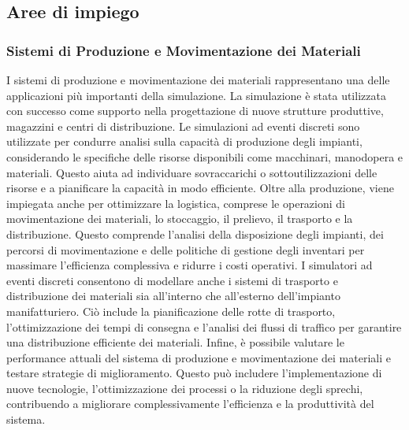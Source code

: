 \documentclass[12pt,a4paper,openright,twoside]{book}
\begin{document}
\subsection{Aree di impiego}
\subsubsection{Sistemi di Produzione e Movimentazione dei Materiali}
I sistemi di produzione e movimentazione dei materiali rappresentano una delle applicazioni più importanti della simulazione. La simulazione è stata utilizzata con successo come supporto nella progettazione di nuove strutture produttive, magazzini e centri di distribuzione.
Le simulazioni ad eventi discreti sono utilizzate per condurre analisi sulla capacità di produzione degli impianti, considerando le specifiche delle risorse disponibili come macchinari, manodopera e materiali. Questo aiuta ad individuare sovraccarichi o sottoutilizzazioni delle risorse e a pianificare la capacità in modo efficiente. 
Oltre alla produzione, viene impiegata anche per ottimizzare la logistica, comprese le operazioni di movimentazione dei materiali, lo stoccaggio, il prelievo, il trasporto e la distribuzione. Questo comprende l'analisi della disposizione degli impianti, dei percorsi di movimentazione e delle politiche di gestione degli inventari per massimare l'efficienza complessiva e ridurre i costi operativi. 
I simulatori ad eventi discreti consentono di modellare anche i sistemi di trasporto e distribuzione dei materiali sia all'interno che all'esterno dell'impianto manifatturiero. Ciò include la pianificazione delle rotte di trasporto, l'ottimizzazione dei tempi di consegna e l'analisi dei flussi di traffico per garantire una distribuzione efficiente dei materiali.
Infine, è possibile valutare le performance attuali del sistema di produzione e movimentazione dei materiali e testare strategie di miglioramento. Questo può includere l'implementazione di nuove tecnologie, l'ottimizzazione dei processi o la riduzione degli sprechi, contribuendo a migliorare complessivamente l'efficienza e la produttività del sistema.
\end{document}
